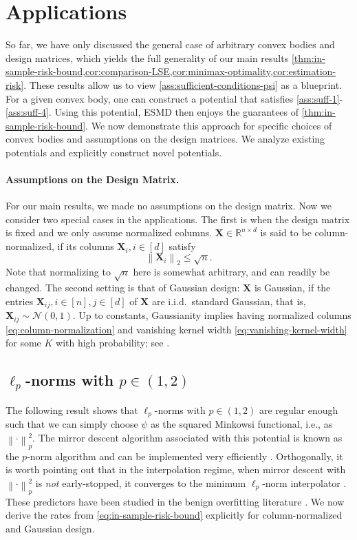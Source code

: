 \documentclass[a4paper]{article}
\newcommand{\norm}[1]{\left\|#1\right\|}
\newcommand{\X}[0]{\mathbf{X}}
\newcommand{\RR}[0]{\mathbb{R}}
\newcommand{\cN}[0]{\mathcal{N}}
\theoremstyle{thmstyle}
\theoremstyle{defstyle}
\theoremstyle{remark}
\begin{document}
\section{Applications}
\label{sec:applications}
So far, we have only discussed the general case of arbitrary convex bodies and design matrices, which yields the full generality of our main results \cref{thm:in-sample-risk-bound,cor:comparison-LSE,cor:minimax-optimality,cor:estimation-risk}. 
These results allow us to view \cref{ass:sufficient-conditions-psi} as a blueprint. For a given convex body, one can construct a potential that satisfies \ref{ass:suff-1}-\ref{ass:suff-4}. Using this potential, ESMD then enjoys the guarantees of \cref{thm:in-sample-risk-bound}.
We now demonstrate this approach for specific choices of convex bodies and assumptions on the design matrices. We analyze existing potentials and explicitly construct novel potentials.

\paragraph{Assumptions on the Design Matrix.}
For our main results, we made no assumptions on the design matrix. Now we consider two special cases in the applications. The first is when the design matrix is fixed and we only assume normalized columns.
$\X\in\RR^{n\times d}$ is said to be column-normalized, if its columns $\X_i,i\in[d]$ satisfy
\begin{equation}
\label{eq:column-normalization}
    \norm{\X_i}_2\leq \sqrt{n}.
\end{equation}
Note that normalizing to $\sqrt{n}$ here is somewhat arbitrary, and can readily be changed.
The second setting is that of Gaussian design:
$\X$ is Gaussian, if the entries $\X_{ij},i\in[n],j\in[d]$ of $\X$ are i.i.d.\ standard Gaussian, that is, $\X_{ij}\sim \cN(0,1)$. 
Up to constants, Gaussianity implies having normalized columns \eqref{eq:column-normalization} and vanishing kernel width \eqref{eq:vanishing-kernel-width} for some $K$ with high probability; see \cite[Sec. 3.2]{Raskutti2011}.

\subsection{\texorpdfstring{$\ell_p$}{lp}-norms with \texorpdfstring{$p\in(1,2)$}{p in (1,2)}}

The following result shows that $\ell_p$-norms with $p\in(1,2)$ are regular enough such that we can simply choose $\psi$ as the squared Minkowsi functional, i.e., as $\norm{\cdot}_p^2$. 
The mirror descent algorithm associated with this potential is known as the $p$-norm algorithm \citep{Shalev2007online,Levy2019necessary,Orabona2023modern} and can be implemented very efficiently \citep{Gentile2003}. 
Orthogonally, it is worth pointing out that in the interpolation regime, when mirror descent with $\norm{\cdot}_p^2$ is \emph{not} early-stopped, it converges to the minimum $\ell_p$-norm interpolator \citep{Gunasekar2018}. These predictors have been studied in the benign overfitting literature \citep{Donhauser2022,Kur2024minimum}. 
We now derive the rates from \eqref{eq:in-sample-risk-bound} explicitly for column-normalized and Gaussian design.
\end{document}
